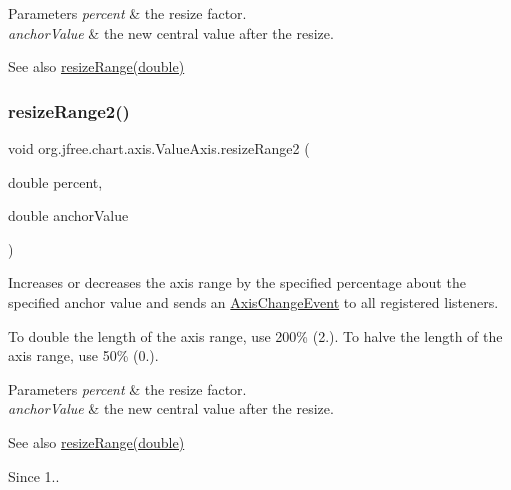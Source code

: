 \begin{DoxyParams}{Parameters}
{\em percent} & the resize factor. \\
\hline
{\em anchor\+Value} & the new central value after the resize.\\
\hline
\end{DoxyParams}
\begin{DoxySeeAlso}{See also}
\mbox{\hyperlink{classorg_1_1jfree_1_1chart_1_1axis_1_1_value_axis_a72029be0ff09e06486afc057309fa222}{resize\+Range(double)}} 
\end{DoxySeeAlso}
\mbox{\label{classorg_1_1jfree_1_1chart_1_1axis_1_1_value_axis_aca7376f82e581b94bd2887e32e043bb1}} 
\subsubsection{\texorpdfstring{resize\+Range2()}{resizeRange2()}}
{\footnotesize\ttfamily void org.\+jfree.\+chart.\+axis.\+Value\+Axis.\+resize\+Range2 (\begin{DoxyParamCaption}\item[{double}]{percent,  }\item[{double}]{anchor\+Value }\end{DoxyParamCaption})}

Increases or decreases the axis range by the specified percentage about the specified anchor value and sends an \mbox{\hyperlink{}{Axis\+Change\+Event}} to all registered listeners. 

To double the length of the axis range, use 200\% (2.). To halve the length of the axis range, use 50\% (0.).


\begin{DoxyParams}{Parameters}
{\em percent} & the resize factor. \\
\hline
{\em anchor\+Value} & the new central value after the resize.\\
\hline
\end{DoxyParams}
\begin{DoxySeeAlso}{See also}
\mbox{\hyperlink{classorg_1_1jfree_1_1chart_1_1axis_1_1_value_axis_a72029be0ff09e06486afc057309fa222}{resize\+Range(double)}}
\end{DoxySeeAlso}
\begin{DoxySince}{Since}
1.. 
\end{DoxySince}
\mbox{\label{classorg_1_1jfree_1_1chart_1_1axis_1_1_value_axis_a2407eb22460d462c3eb730d5ddb10067}} 

